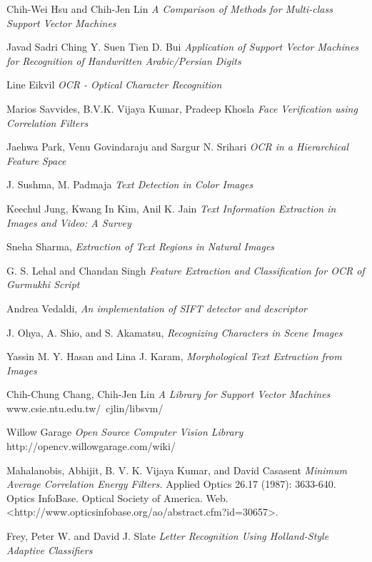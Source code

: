 \begin{thebibliography}{99}
  Chih-Wei Hsu and Chih-Jen Lin
  \textit{A Comparison of Methods for Multi-class Support Vector Machines} 
  
  Javad Sadri Ching Y. Suen Tien D. Bui
  \textit{Application of Support Vector Machines for Recognition of Handwritten Arabic/Persian Digits} 
  
  Line Eikvil
  \textit{OCR - Optical Character Recognition} 
  
  Marios Savvides, B.V.K. Vijaya Kumar, Pradeep Khosla
  \textit{Face Verification using Correlation Filters}
  
  Jaehwa Park, Venu Govindaraju and Sargur N. Srihari
  \textit{OCR in a Hierarchical Feature Space}
  
  J. Sushma, M. Padmaja
  \textit{Text Detection in Color Images}
  
  Keechul Jung, Kwang In Kim, Anil K. Jain
  \textit{Text Information Extraction in Images and Video: A Survey}
  
  Sneha Sharma,
  \textit{Extraction of Text Regions in Natural Images}
  
  G. S. Lehal and Chandan Singh
  \textit{Feature Extraction and Classification for OCR of Gurmukhi Script}
  
  Andrea Vedaldi,
  \textit{An implementation of SIFT detector and descriptor}
  
  J. Ohya, A. Shio, and S. Akamatsu,
  \textit{Recognizing Characters in Scene Images}
  
  Yassin M. Y. Hasan and Lina J. Karam,
  \textit{Morphological Text Extraction from Images}
  
  Chih-Chung Chang, Chih-Jen Lin
  \textit{A Library for Support Vector Machines}
  www.csie.ntu.edu.tw/~cjlin/libsvm/
  
  Willow Garage
  \textit{Open Source Computer Vision Library}
  http://opencv.willowgarage.com/wiki/
  
  Mahalanobis, Abhijit, B. V. K. Vijaya Kumar, and David Casasent
  \textit{Minimum Average Correlation Energy Filters.}
  Applied Optics 26.17 (1987): 3633-640. Optics InfoBase. 
  Optical Society of America. Web. 
  <http://www.opticsinfobase.org/ao/abstract.cfm?id=30657>.
  
  Frey, Peter W. and David J. Slate
  \textit{Letter Recognition Using Holland-Style Adaptive Classifiers}  
\end{thebibliography}